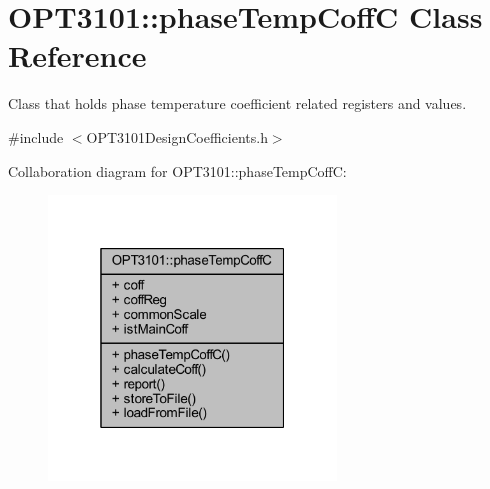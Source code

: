 \hypertarget{class_o_p_t3101_1_1phase_temp_coff_c}{}\section{O\+P\+T3101\+:\+:phase\+Temp\+CoffC Class Reference}
\label{class_o_p_t3101_1_1phase_temp_coff_c}


Class that holds phase temperature coefficient related registers and values.  




{\ttfamily \#include $<$O\+P\+T3101\+Design\+Coefficients.\+h$>$}



Collaboration diagram for O\+P\+T3101\+:\+:phase\+Temp\+CoffC\+:\nopagebreak
\begin{figure}[H]
\begin{center}
\leavevmode
\includegraphics[width=217pt]{class_o_p_t3101_1_1phase_temp_coff_c__coll__graph}
\end{center}
\end{figure}
